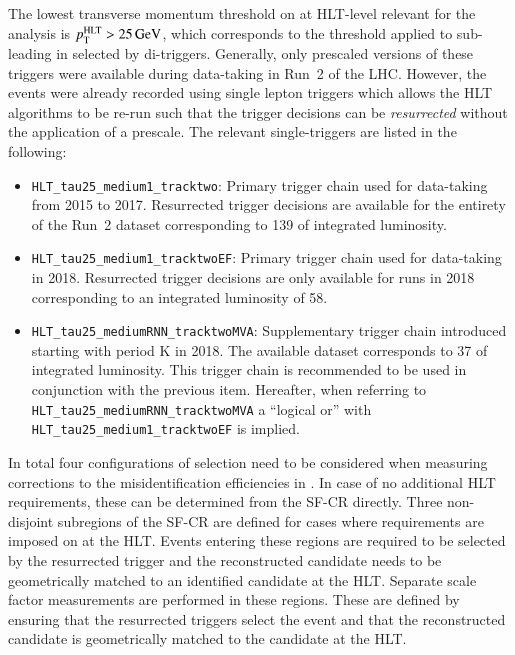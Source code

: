 The lowest transverse momentum threshold on \tauhadvis at HLT-level
relevant for the analysis is $p_{\text{T}}^{\text{HLT}} > \SI{25}{\ensuremath{\text{GeV}}}$, which
corresponds to the threshold applied to \tauhadvis sub-leading in \pT
selected by di-\tauhadvis triggers. Generally, only prescaled versions
of these triggers were available during data-taking in Run~2 of the
LHC. However, the events were already recorded using single lepton
triggers which allows the HLT algorithms to be re-run such that the
trigger decisions can be \textit{resurrected} without the application
of a prescale. The relevant single-\tauhadvis triggers are listed in
the following:%
\begin{itemize}
\item \verb|HLT_tau25_medium1_tracktwo|: Primary trigger chain used
  for data-taking from 2015 to 2017. Resurrected trigger decisions are
  available for the entirety of the Run~2 dataset corresponding to
  \SI{139}{\ifb} of integrated luminosity.

\item \verb|HLT_tau25_medium1_tracktwoEF|: Primary trigger chain used
  for data-taking in 2018. Resurrected trigger decisions are only
  available for runs in 2018 corresponding to an integrated luminosity
  of \SI{58}{\ifb}.

\item \verb|HLT_tau25_mediumRNN_tracktwoMVA|: Supplementary trigger
  chain introduced starting with period K in 2018. The available
  dataset corresponds to \SI{37}{\ifb} of integrated luminosity.  This
  trigger chain is recommended to be used in conjunction with the
  previous item. Hereafter, when referring to
  \verb|HLT_tau25_mediumRNN_tracktwoMVA| a ``logical or'' with
  \verb|HLT_tau25_medium1_tracktwoEF| is implied.
\end{itemize}

In total four configurations of \tauhadvis selection need to be
considered when measuring corrections to the \jettotauhadvis
misidentification efficiencies in \ttbar. In case of no additional HLT
requirements, these can be determined from the SF-CR directly. Three
non-disjoint subregions of the SF-CR are defined for cases where
requirements are imposed on \tauhadvis at the HLT. Events entering
these regions are required to be selected by the resurrected trigger
and the reconstructed \tauhadvis candidate needs to be geometrically
matched to an identified \tauhadvis candidate at the HLT. Separate
scale factor measurements are performed in these regions. These are defined
by ensuring that the resurrected triggers select the event and that
the reconstructed \tauhadvis candidate is geometrically matched to the
\tauhadvis candidate at the HLT.



